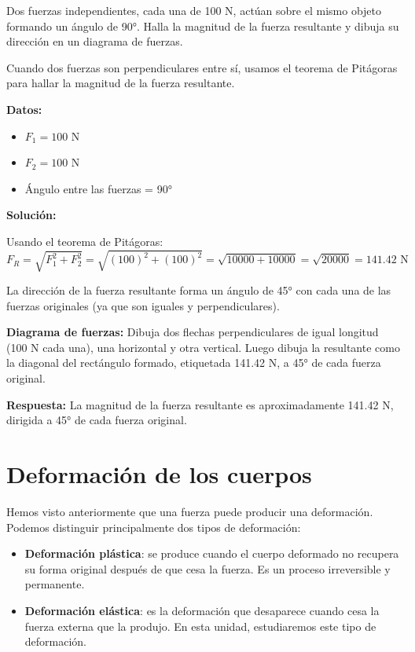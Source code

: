 \begin{exercise}
    Dos fuerzas independientes, cada una de 100 N, actúan sobre el mismo objeto formando un ángulo de \ang{90}.
    Halla la magnitud de la fuerza resultante y dibuja su dirección en un diagrama de fuerzas.

    \begin{solu}
        Cuando dos fuerzas son perpendiculares entre sí, usamos el teorema de Pitágoras para hallar la magnitud de la fuerza resultante.

        \textbf{Datos:}
        \begin{itemize}
            \item $F_1 = 100$ N
            \item $F_2 = 100$ N
            \item Ángulo entre las fuerzas = 90°
        \end{itemize}

        \textbf{Solución:}

        Usando el teorema de Pitágoras:
        $$F_R = \sqrt{F_1^2 + F_2^2} = \sqrt{(100)^2 + (100)^2} = \sqrt{10000 + 10000} = \sqrt{20000} = 141.42\text{ N}$$

        La dirección de la fuerza resultante forma un ángulo de 45° con cada una de las fuerzas originales (ya que son iguales y perpendiculares).

        \textbf{Diagrama de fuerzas:} Dibuja dos flechas perpendiculares de igual longitud (100 N cada una), una horizontal y otra vertical. Luego dibuja la resultante como la diagonal del rectángulo formado, etiquetada 141.42 N, a 45° de cada fuerza original.

        \textbf{Respuesta:} La magnitud de la fuerza resultante es aproximadamente 141.42 N, dirigida a 45° de cada fuerza original.
    \end{solu}
\end{exercise}


\section{Deformación de los cuerpos}


Hemos visto anteriormente que una fuerza puede producir una deformación.
Podemos distinguir principalmente dos tipos de deformación:

\begin{itemize}
    \item \textbf{Deformación plástica}: se produce cuando el cuerpo deformado no recupera su forma original después de que cesa la fuerza.
    Es un proceso irreversible y permanente.
    \item \textbf{Deformación elástica}: es la deformación que desaparece cuando cesa la fuerza externa que la produjo.
    En esta unidad, estudiaremos este tipo de deformación.
\end{itemize}

